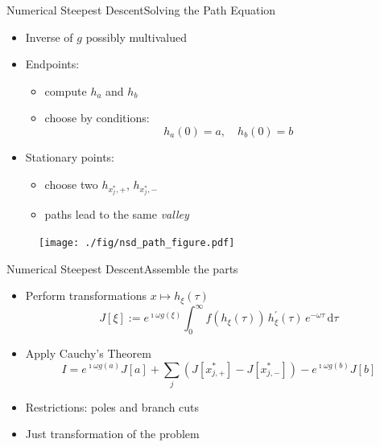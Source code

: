 \documentclass{beamer}
\begin{document}
\begin{frame}{Numerical Steepest Descent}{Solving the Path Equation}
  \begin{minipage}{0.58\linewidth}
    \begin{itemize}
      \item Inverse of $g$ possibly multivalued
      \item Endpoints:
        \begin{itemize}
          \item compute $h_a$ and $h_b$
          \item choose by conditions:
          \begin{equation*}
            h_a(0) = a, \quad h_b(0) = b
          \end{equation*}
        \end{itemize}
      \item Stationary points:
        \begin{itemize}
          \item choose two $h_{x^{*}_j,+}$, $h_{x^{*}_j,-}$
          \item paths lead to the same \emph{valley}
        \end{itemize}
    \end{itemize}
  \end{minipage}
  \begin{minipage}{0.40\linewidth}
    \begin{figure}
      \centering
      \texttt{[image: ./fig/nsd\_path\_figure.pdf]}
    \end{figure}
  \end{minipage}
\end{frame}


\begin{frame}{Numerical Steepest Descent}{Assemble the parts}
  \begin{itemize}
    \item Perform transformations $x \mapsto h_{\xi}(\tau)$
    \begin{equation*}
      J[\xi] :=
      e^{\imath \omega g(\xi)}
      \int_{0}^{\infty}
        f(h_{\xi}(\tau)) \,
        h_{\xi}^{\prime}(\tau) \,
        e^{-\omega \tau} \,
      \mathrm{d}\tau
    \end{equation*}
    \item Apply Cauchy's Theorem
    \begin{equation*}
      I = e^{\imath\omega g(a)} J[a]
        + \sum_{j} \left(J[x_{j,+}^{*}] - J[x_{j,-}^{*}]\right)
        - e^{\imath\omega g(b)} J[b]
    \end{equation*}
    \item Restrictions: poles and branch cuts
    \item Just transformation of the problem
  \end{itemize}
\end{frame}
\end{document}
